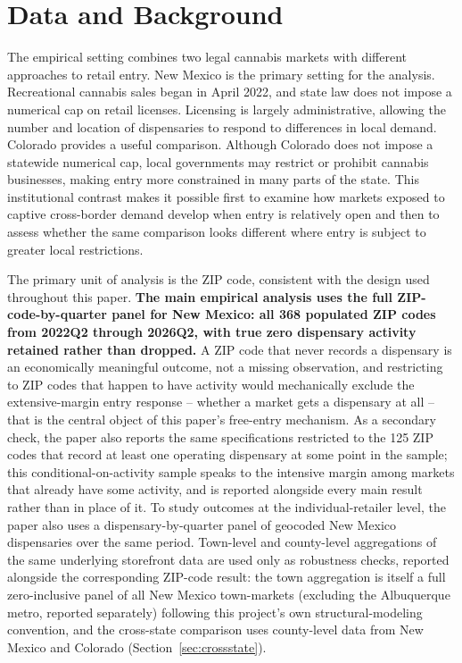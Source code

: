 \documentclass[english,12pt]{article}
\begin{document}
\section{Data and Background}
\label{sec:data}

The empirical setting combines two legal cannabis markets with different approaches to retail entry. New Mexico is the primary setting for the analysis. Recreational cannabis sales began in April 2022, and state law does not impose a numerical cap on retail licenses. Licensing is largely administrative, allowing the number and location of dispensaries to respond to differences in local demand. Colorado provides a useful comparison. Although Colorado does not impose a statewide numerical cap, local governments may restrict or prohibit cannabis businesses, making entry more constrained in many parts of the state. This institutional contrast makes it possible first to examine how markets exposed to captive cross-border demand develop when entry is relatively open and then to assess whether the same comparison looks different where entry is subject to greater local restrictions.

The primary unit of analysis is the ZIP code, consistent with the design used throughout this paper. \textbf{The main empirical analysis uses the full ZIP-code-by-quarter panel for New Mexico: all 368 populated ZIP codes from 2022Q2 through 2026Q2, with true zero dispensary activity retained rather than dropped.} A ZIP code that never records a dispensary is an economically meaningful outcome, not a missing observation, and restricting to ZIP codes that happen to have activity would mechanically exclude the extensive-margin entry response -- whether a market gets a dispensary at all -- that is the central object of this paper's free-entry mechanism. As a secondary check, the paper also reports the same specifications restricted to the 125 ZIP codes that record at least one operating dispensary at some point in the sample; this conditional-on-activity sample speaks to the intensive margin among markets that already have some activity, and is reported alongside every main result rather than in place of it. To study outcomes at the individual-retailer level, the paper also uses a dispensary-by-quarter panel of geocoded New Mexico dispensaries over the same period. Town-level and county-level aggregations of the same underlying storefront data are used only as robustness checks, reported alongside the corresponding ZIP-code result: the town aggregation is itself a full zero-inclusive panel of all New Mexico town-markets (excluding the Albuquerque metro, reported separately) following this project's own structural-modeling convention, and the cross-state comparison uses county-level data from New Mexico and Colorado (Section~\ref{sec:crossstate}).
\end{document}
